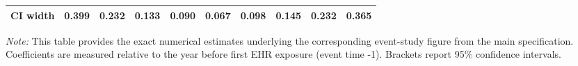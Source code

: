 \begin{landscape}
\begin{table}[!h]
\begin{tabular}[t]{lccccccccc}
\hspace{1em}CI width & 0.399 & 0.232 & 0.133 & 0.090 & 0.067 & 0.098 & 0.145 & 0.232 & 0.365\\
\bottomrule
\end{tabular}
\begin{tablenotes}
\item \textit{Note: } This table provides the exact numerical estimates underlying the corresponding event-study figure from the main specification. Coefficients are measured relative to the year before first EHR exposure (event time -1). Brackets report 95\% confidence intervals. 
\end{tablenotes}
\end{table}
\end{landscape}
